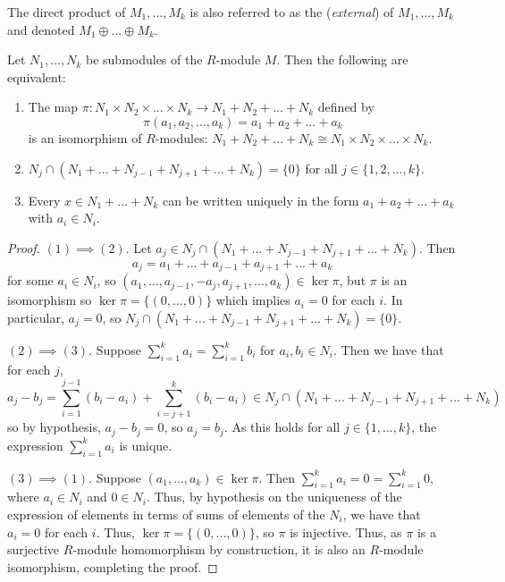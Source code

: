 \documentclass[12pt, a4paper, oneside, openright, titlepage]{book}
\begin{document}
The direct product of $M_1,...,M_k$ is also referred to as the (\emph{external})  of $M_1,...,M_k$ and denoted $M_1\oplus ... \oplus M_k$. 

\begin{prop}
    Let $N_1,...,N_k$ be submodules of the $R$-module $M$. Then the following are equivalent: \begin{enumerate}
        \item The map $\pi:N_1\times N_2\times ... \times N_k\rightarrow N_1+N_2+...+N_k$ defined by \begin{equation*}
                \pi(a_1,a_2,...,a_k) = a_1+a_2+...+a_k
        \end{equation*}
            is an isomorphism of $R$-modules: $N_1+N_2+...+N_k\cong N_1\times N_2\times ...\times N_k$.
        \item $N_j\cap(N_1+...+N_{j-1}+N_{j+1}+...+N_k) = \{0\}$ for all $j \in \{1,2,...,k\}$.
        \item Every $x \in N_1+...+N_k$ can be written uniquely in the form $a_1+a_2+...+a_k$ with $a_i \in N_i$.
    \end{enumerate}
\end{prop}
\begin{proof}
    $(1)\implies (2)$. Let $a_j \in N_j\cap(N_1+...+N_{j-1}+N_{j+1}+...+N_k)$. Then \begin{equation*}
        a_j = a_1+...+a_{j-1}+a_{j+1}+...+a_k
    \end{equation*}
    for some $a_i \in N_i$, so $(a_1,...,a_{j-1},-a_j,a_{j+1},...,a_k) \in \ker \pi$, but $\pi$ is an isomorphism so $\ker\pi = \{(0,...,0)\}$ which implies $a_i = 0$ for each $i$. In particular, $a_j = 0$, so $N_j\cap(N_1+...+N_{j-1}+N_{j+1}+...+N_k) = \{0\}$.

    $(2)\implies (3)$. Suppose $\sum_{i=1}^ka_i = \sum_{i=1}^kb_i$ for $a_i,b_i \in N_i$. Then we have that for each $j$, $$a_j-b_j = \sum_{i=1}^{j-1}(b_i-a_i)+\sum_{i=j+1}^k(b_i-a_i) \in N_j\cap(N_1+...+N_{j-1}+N_{j+1}+...+N_k)$$ so by hypothesis, $a_j -b_j = 0$, so $a_j = b_j$. As this holds for all $j \in \{1,...,k\}$, the expression $\sum_{i=1}^ka_i$ is unique.

    $(3)\implies (1)$. Suppose $(a_1,...,a_k) \in \ker\pi$. Then $\sum_{i=1}^ka_i = 0 = \sum_{i=1}^k0$, where $a_i \in N_i$ and $0 \in N_i$. Thus, by hypothesis on the uniqueness of the expression of elements in terms of sums of elements of the $N_i$, we have that $a_i = 0$ for each $i$. Thus, $\ker\pi = \{(0,...,0)\}$, so $\pi$ is injective. Thus, as $\pi$ is a surjective $R$-module homomorphism by construction, it is also an $R$-module isomorphism, completing the proof.
\end{proof}
\end{document}
